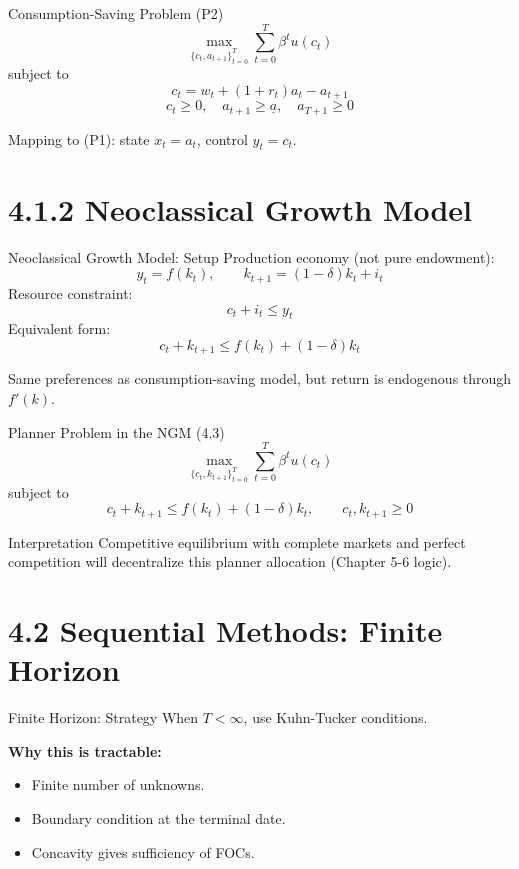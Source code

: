 \documentclass[aspectratio=169,10pt]{beamer}
\begin{document}
\begin{frame}{Consumption-Saving Problem (P2)}
\[
\max_{\{c_t,a_{t+1}\}_{t=0}^{T}}\sum_{t=0}^{T}\beta^t u(c_t)
\]
subject to
\[
c_t=w_t+(1+r_t)a_t-a_{t+1}
\]
\[
c_t\ge 0,\quad a_{t+1}\ge \underline{a},\quad a_{T+1}\ge 0
\]

Mapping to (P1): state $x_t=a_t$, control $y_t=c_t$.
\end{frame}

\section{4.1.2 Neoclassical Growth Model}

\begin{frame}{Neoclassical Growth Model: Setup}
Production economy (not pure endowment):
\[
y_t=f(k_t),\qquad k_{t+1}=(1-\delta)k_t+i_t
\]
Resource constraint:
\[
c_t+i_t\le y_t
\]
Equivalent form:
\[
c_t+k_{t+1}\le f(k_t)+(1-\delta)k_t
\]

\medskip
Same preferences as consumption-saving model, but return is endogenous through $f'(k)$.
\end{frame}

\begin{frame}{Planner Problem in the NGM (4.3)}
\[
\max_{\{c_t,k_{t+1}\}_{t=0}^{T}}\sum_{t=0}^{T}\beta^t u(c_t)
\]
subject to
\[
c_t+k_{t+1}\le f(k_t)+(1-\delta)k_t,
\qquad c_t,k_{t+1}\ge 0
\]

\begin{block}{Interpretation}
Competitive equilibrium with complete markets and perfect competition will decentralize this planner allocation (Chapter 5-6 logic).
\end{block}
\end{frame}

\section{4.2 Sequential Methods: Finite Horizon}

\begin{frame}{Finite Horizon: Strategy}
When $T<\infty$, use Kuhn-Tucker conditions.

\medskip
\textbf{Why this is tractable:}
\begin{itemize}
  \item Finite number of unknowns.
  \item Boundary condition at the terminal date.
  \item Concavity gives sufficiency of FOCs.
\end{itemize}
\end{frame}
\end{document}
